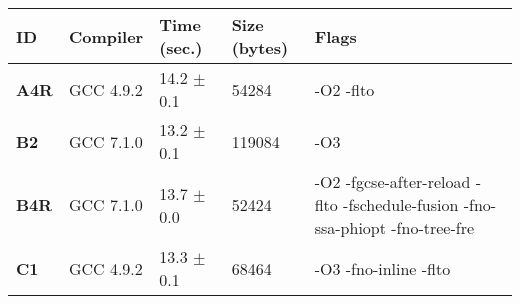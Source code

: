     \begin{tabular}{|l|l|l|l|p{3.2in}|}
     \hline
      \textbf{ID} & \textbf{Compiler} & \textbf{Time (sec.)} & \textbf{Size (bytes)} & \textbf{Flags} \\ 
     \hline
      \textbf{ A4R } &  GCC 4.9.2  &  14.2 $\pm$ 0.1  &  54284  & {\small -O2 -flto }\\
     \hline
      \textbf{ B2 } &  GCC 7.1.0  &  13.2 $\pm$ 0.1  &  119084  & {\small -O3 }\\
     \hline
      \textbf{ B4R } &  GCC 7.1.0  &  13.7 $\pm$ 0.0  &  52424  & {\small -O2 -fgcse-after-reload -flto -fschedule-fusion -fno-ssa-phiopt -fno-tree-fre }\\
     \hline
      \textbf{ C1 } &  GCC 4.9.2  &  13.3 $\pm$ 0.1  &  68464  & {\small -O3 -fno-inline -flto }\\
     \hline
    \end{tabular}    